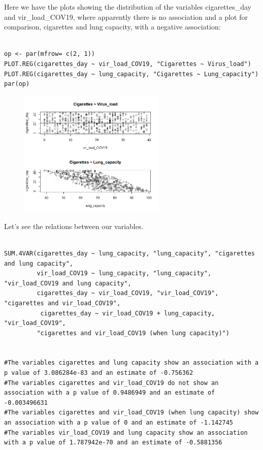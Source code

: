 \documentclass{article}
\begin{document}
Here we have the plots showing the distribution of the variables cigarettes\_day and vir\_load\_COV19, where apparently there is no association and a plot for comparison, cigarettes and lung capacity, with a negative association:


\begin{lstlisting}

op <- par(mfrow= c(2, 1))
PLOT.REG(cigarettes_day ~ vir_load_COV19, "Cigarettes ~ Virus_load")
PLOT.REG(cigarettes_day ~ lung_capacity, "Cigarettes ~ Lung_capacity")
par(op)

\end{lstlisting}


\begin{figure}[h]
\includegraphics[width=7cm]{PLOT_cig_vir_lung.png}
\centering
\end{figure}

Let's see the relations between our variables.

\begin{lstlisting}

SUM.4VAR(cigarettes_day ~ lung_capacity, "lung_capacity", "cigarettes and lung capacity",
         vir_load_COV19 ~ lung_capacity, "lung_capacity", "vir_load_COV19 and lung capacity",
         cigarettes_day ~ vir_load_COV19, "vir_load_COV19", "cigarettes and vir_load_COV19",
          cigarettes_day ~ vir_load_COV19 + lung_capacity, "vir_load_COV19",
         "cigarettes and vir_load_COV19 (when lung capacity)")


#The variables cigarettes and lung capacity show an association with a p value of 3.086284e-83 and an estimate of -0.756362 
#The variables cigarettes and vir_load_COV19 do not show an association with a p value of 0.9486949 and an estimate of -0.003496631 
#The variables cigarettes and vir_load_COV19 (when lung capacity) show an association with a p value of 0 and an estimate of -1.142745 
#The variables vir_load_COV19 and lung capacity show an association with a p value of 1.787942e-70 and an estimate of -0.5881356 

\end{lstlisting}
\end{document}
